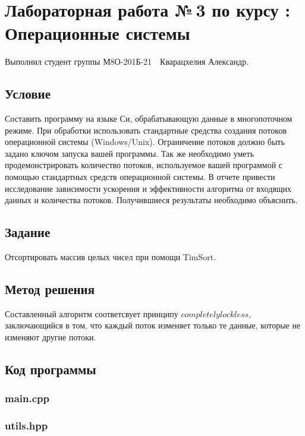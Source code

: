 \documentclass[12pt]{article}
\begin{document}
	
	\section*{\centering Лабораторная работа №\,3 по курсу :\\ Операционные системы}
	
	Выполнил студент группы М8О-201Б-21 \,\, Кварацхелия Александр.
	
	\subsection*{Условие}
	
	Составить программу на языке Си, обрабатывающую данные в многопоточном режиме. При 
	обработки использовать стандартные средства создания потоков операционной системы 
	(Windows/Unix). Ограничение потоков должно быть задано ключом запуска вашей программы.
	Так же необходимо уметь продемонстрировать количество потоков, используемое вашей 
	программой с помощью стандартных средств операционной системы.
	В отчете привести исследование зависимости ускорения и эффективности алгоритма от входящих 
	данных и количества потоков. Получившиеся результаты необходимо объяснить.
	
	\subsection*{Задание}
	
	Отсортировать массив целых чисел при помощи TimSort.
	
	\subsection*{Метод решения}
	
	Составленный алгоритм соответсвует принципу $completely lockless$, заключающийся в том, что каждый поток изменяет только те данные, которые не изменяют другие потоки.
	
	\subsection*{Код программы}
	
	\subsubsection{main.cpp}
	
	
	
	\subsubsection*{utils.hpp}
	
\end{document}
